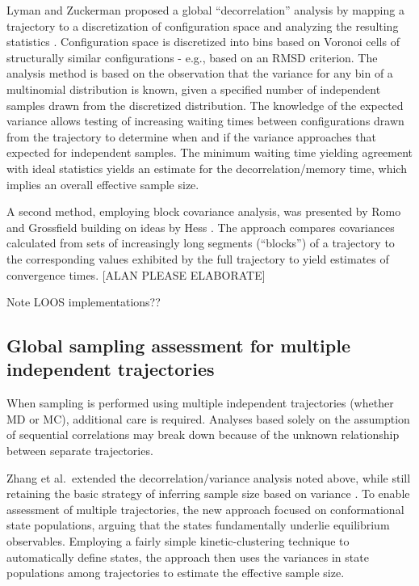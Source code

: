 Lyman and Zuckerman proposed a global ``decorrelation'' analysis by mapping a trajectory to a discretization of configuration space and analyzing the resulting statistics \cite{Lyman2007a}.
Configuration space is discretized into bins based on Voronoi cells of structurally similar configurations - e.g., based on an RMSD criterion.
The analysis method is based on the observation that the variance for any bin of a multinomial distribution is known, given a specified number of independent samples drawn from the discretized distribution.
The knowledge of the expected variance allows testing of increasing waiting times between configurations drawn from the trajectory to determine when and if the variance approaches that expected for independent samples.
The minimum waiting time yielding agreement with ideal statistics yields an estimate for the decorrelation/memory time, which implies an overall effective sample size.

A second method, employing block covariance analysis, was presented by Romo and Grossfield \cite{Romo2011} building on ideas by Hess \cite{Hess2002}.
The approach compares covariances calculated from sets of increasingly long segments (``blocks'') of a trajectory to the corresponding values exhibited by the full trajectory to yield estimates of convergence times.
[ALAN PLEASE ELABORATE]

Note LOOS implementations??

\subsection{Global sampling assessment for multiple independent trajectories}
When sampling is performed using multiple independent trajectories (whether MD or MC), additional care is required.
Analyses based solely on the assumption of sequential correlations may break down because of the unknown relationship between separate trajectories.

Zhang et al.\ extended the decorrelation/variance analysis noted above, while still retaining the basic strategy of inferring sample size based on variance \cite{Zhang2010}.
To enable assessment of multiple trajectories, the new approach focused on conformational state populations, arguing that the states fundamentally underlie equilibrium observables.
Employing a fairly simple kinetic-clustering technique to automatically define states, the approach then uses the variances in state populations among trajectories to estimate the effective sample size.

